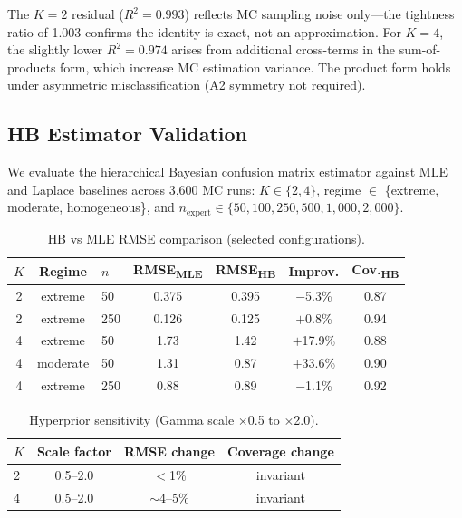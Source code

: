 \documentclass[11pt,a4paper]{article}
\begin{document}
The $K=2$ residual ($R^2 = 0.993$) reflects MC sampling noise only---the tightness ratio of 1.003 confirms the identity is exact, not an approximation.
For $K=4$, the slightly lower $R^2 = 0.974$ arises from additional cross-terms in the sum-of-products form, which increase MC estimation variance.
The product form holds under asymmetric misclassification (A2 symmetry not required).


\subsection{HB Estimator Validation}\label{sec:synthetic}

We evaluate the hierarchical Bayesian confusion matrix estimator against MLE and Laplace baselines across 3{,}600 MC runs: $K \in \{2, 4\}$, regime $\in$ \{extreme, moderate, homogeneous\}, and $n_{\text{expert}} \in \{50, 100, 250, 500, 1{,}000, 2{,}000\}$.

\begin{table}[t]
\centering
\small
\caption{HB vs MLE RMSE comparison (selected configurations).}
\label{tab:hb_mle}
\begin{tabular}{@{}cclcccc@{}}
\toprule
$K$ & Regime & $n$ & RMSE\textsubscript{MLE} & RMSE\textsubscript{HB} & Improv. & Cov.\textsubscript{HB} \\
\midrule
2 & extreme & 50 & 0.375 & 0.395 & $-$5.3\% & 0.87 \\
2 & extreme & 250 & 0.126 & 0.125 & $+$0.8\% & 0.94 \\
4 & extreme & 50 & 1.73 & 1.42 & $+$17.9\% & 0.88 \\
4 & moderate & 50 & 1.31 & 0.87 & $+$33.6\% & 0.90 \\
4 & extreme & 250 & 0.88 & 0.89 & $-$1.1\% & 0.92 \\
\bottomrule
\end{tabular}
\end{table}

\begin{table}[t]
\centering
\small
\caption{Hyperprior sensitivity (Gamma scale $\times$0.5 to $\times$2.0).}
\label{tab:hyperprior}
\begin{tabular}{@{}lccc@{}}
\toprule
$K$ & Scale factor & RMSE change & Coverage change \\
\midrule
2 & 0.5--2.0 & $<$1\% & invariant \\
4 & 0.5--2.0 & $\sim$4--5\% & invariant \\
\bottomrule
\end{tabular}
\end{table}
\end{document}
